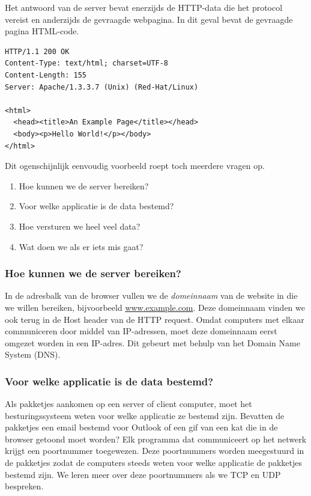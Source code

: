 Het antwoord van de server bevat enerzijds de HTTP-data die het protocol vereist en anderzijds de gevraagde webpagina.
In dit geval bevat de gevraagde pagina HTML-code.
\begin{verbatim}
HTTP/1.1 200 OK
Content-Type: text/html; charset=UTF-8
Content-Length: 155
Server: Apache/1.3.3.7 (Unix) (Red-Hat/Linux)

<html>
  <head><title>An Example Page</title></head>
  <body><p>Hello World!</p></body>
</html>
\end{verbatim}

Dit ogenschijnlijk eenvoudig voorbeeld roept toch meerdere vragen op.
\begin{enumerate}
\item Hoe kunnen we de server bereiken?
\item Voor welke applicatie is de data bestemd?
\item Hoe versturen we heel veel data?
\item Wat doen we als er iets mis gaat?
\end{enumerate}



\subsubsection{Hoe kunnen we de server bereiken?}
In de adresbalk van de browser vullen we de \emph{domeinnaam} van de website in die we willen bereiken, bijvoorbeeld \url{www.example.com}.
Deze domeinnaam vinden we ook terug in de Host header van de HTTP request.
Omdat computers met elkaar communiceren door middel van IP-adressen, moet deze domeinnaam eerst omgezet worden in een IP-adres.
Dit gebeurt met behulp van het Domain Name System (DNS).

\subsubsection{Voor welke applicatie is de data bestemd?}
Als pakketjes aankomen op een server of client computer, moet het besturingssysteem weten voor welke applicatie ze bestemd zijn.
Bevatten de pakketjes een email bestemd voor Outlook of een gif van een kat die in de browser getoond moet worden?
Elk programma dat communiceert op het netwerk krijgt een poortnummer toegewezen.
Deze poortnummers worden meegestuurd in de pakketjes zodat de computers steeds weten voor welke applicatie de pakketjes bestemd zijn.
We leren meer over deze poortnummers als we TCP en UDP bespreken.


